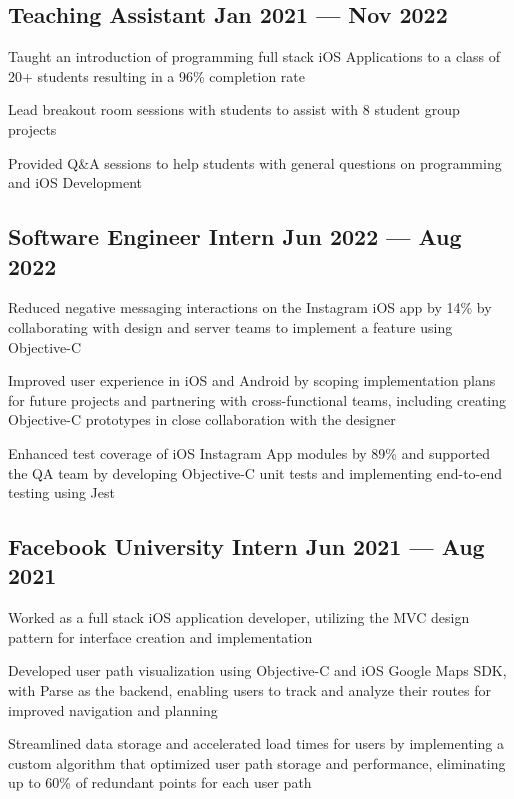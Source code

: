 
\subsection{{Teaching Assistant \hfill Jan 2021 --- Nov 2022}}
\begin{zitemize}
\item Taught an introduction of programming full stack iOS Applications to a class of 20+ students resulting in a 96\% completion rate
\item Lead breakout room sessions with students to assist with 8 student group projects
\item Provided Q\&A sessions to help students with general questions on programming and iOS Development
\end{zitemize}


\subsection{{Software Engineer Intern \hfill Jun 2022 --- Aug 2022}}
\begin{zitemize}
\item Reduced negative messaging interactions on the Instagram iOS app by 14\% by collaborating with design and server teams to implement a feature using Objective-C
\item Improved user experience in iOS and Android by scoping implementation plans for future projects and partnering with cross-functional teams, including creating Objective-C prototypes in close collaboration with the designer
\item Enhanced test coverage of iOS Instagram App modules by 89\% and supported the QA team by developing Objective-C unit tests and implementing end-to-end testing using Jest
\end{zitemize}

% 
\subsection{{Facebook University Intern \hfill Jun 2021 --- Aug 2021}}
\begin{zitemize}
\item Worked as a full stack iOS application developer, utilizing the MVC design pattern for interface creation and implementation
\item Developed user path visualization using Objective-C and iOS Google Maps SDK, with Parse as the backend, enabling users to track and analyze their routes for improved navigation and planning
\item Streamlined data storage and accelerated load times for users by implementing a custom algorithm that optimized user path storage and performance, eliminating up to 60\% of redundant points for each user path
\end{zitemize}

